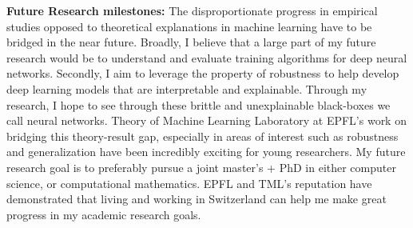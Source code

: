 \documentclass[12pt]{article}
\begin{document}
\textbf{Future Research milestones: }The disproportionate progress in empirical studies opposed to theoretical explanations in machine learning have to be bridged in the near future. Broadly, I believe that a large part of my future research would be to understand and evaluate training algorithms for deep neural networks. Secondly, I aim to leverage the property of robustness to help develop deep learning models that are interpretable and explainable. Through my research, I hope to see through these brittle and unexplainable black-boxes we call neural networks. Theory of Machine Learning Laboratory at EPFL's work on bridging this theory-result gap, especially in areas of interest such as robustness and generalization have been incredibly exciting for young researchers. My future research goal is to preferably pursue a joint master's + PhD in either computer science, or computational mathematics. EPFL and TML's reputation have demonstrated that living and working in Switzerland can help me make great progress in my academic research goals. 

\end{document}
